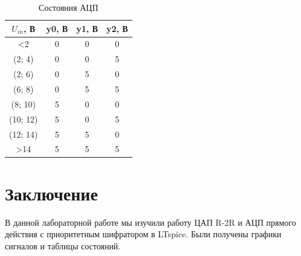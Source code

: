 \begin{table}[H]
    \centering
    \caption{Состояния АЦП}
    \label{tab:adc}
    \begin{tabular}{|c|c|c|c|}
        \hline
        $U_{in}$, В & y0, В & y1, В & y2, В \\ \hline
        <2 & 0 & 0 & 0 \\ \hline
        (2; 4) & 0 & 0 & 5 \\ \hline
        (2; 6) & 0 & 5 & 0 \\ \hline
        (6; 8) & 0 & 5 & 5 \\ \hline
        (8; 10) & 5 & 0 & 0 \\ \hline
        (10; 12) & 5 & 0 & 5 \\ \hline
        (12; 14) & 5 & 5 & 0 \\ \hline
        >14 & 5 & 5 & 5 \\ \hline
    \end{tabular}
\end{table}


\section*{Заключение}

В данной лабораторной работе мы изучили работу ЦАП R-2R и АЦП прямого действия 
с приоритетным шифратором в LTspice. Были получены графики сигналов и
таблицы состояний.